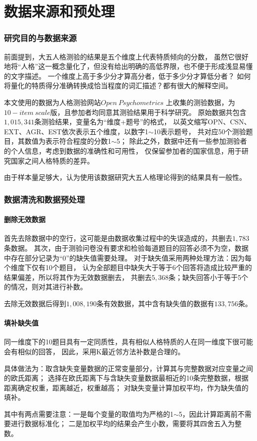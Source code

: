\documentclass[UTF8]{ctexart}
\begin{document}
\part{数据来源和预处理}
\setcounter{section}{0}
\section{研究目的与数据来源}
前面提到，大五人格测验的结果是五个维度上代表特质倾向的分数，
虽然它很好地将“人格”这一概念量化了，但没有给出明确的高低界限，也不便于形成浅显易懂的文字描述。
一个维度上高于多少分才算高分者，低于多少分才算低分者？
如何将量化的特质得分准确转换成恰当程度的词汇描述？都有很大的解释空间。\par
本文使用的数据为人格测验网站\href{https://openpsychometrics.org}{$Open\ Psychometrics$}
上收集的测验数据，为$10-item\ scale$版，且参加者均同意其测验结果用于科学研究。
原始数据共包含$1,015,341$条测验结果，变量名为“维度+题号”的格式，
以英文缩写OPN、CSN、EXT、AGR、EST依次表示五个维度，以数字1$\sim$10表示题号，
共对应50个测验题目，其数值为表示符合程度的分数1$\sim$5；
除此之外，数据中还有一些参加测验者的个人信息，考虑到数据的准确性和可用性，
仅保留参加者的国家信息，用于研究国家之间人格特质的差异。\par
由于样本量足够大，认为使用该数据研究大五人格理论得到的结果具有一般性。
\section{数据清洗和数据预处理}
\subsection*{删除无效数据}
首先去除数据中的空行，这可能是由数据收集过程中的失误造成的，共删去$1,783$条数据。
其次，由于测验问卷没有要求和检验每道题目的回答必须不为空，数据中存在部分记录为“0”的缺失值需要处理。
对于缺失值采用两种处理方法：因为每个维度下仅有10个题目，
认为全部题目中缺失大于等于6个回答将造成比较严重的结果偏差，所以将其作为无效数据删去，
共删去$5,368$条；缺失回答小于等于5个的情况，则对其进行补数。\par
去除无效数据后得到$1,008,190$条有效数据，其中含有缺失值的数据有$133,756$条。
\subsection*{填补缺失值}
同一维度下的10题目具有一定同质性，具有相似人格特质的人在同一维度下很可能会有相似的回答，
因此，采用K最近邻方法补数是合理的。\par
具体做法为：取含缺失变量数据的正常变量部分，计算其与完整数据对应变量之间的欧氏距离；
选择在欧氏距离下与含缺失变量数据最相近的10条完整数据，根据距离确定权重，距离越近，权重越高；
对缺失变量计算加权平均，作为缺失值的填补。\par
其中有两点需要注意：一是每个变量的取值均为严格的1$\sim$5，因此计算距离前不需要进行数据标准化；
二是加权平均的结果会产生小数，需要将其四舍五入为整数。
\end{document}
